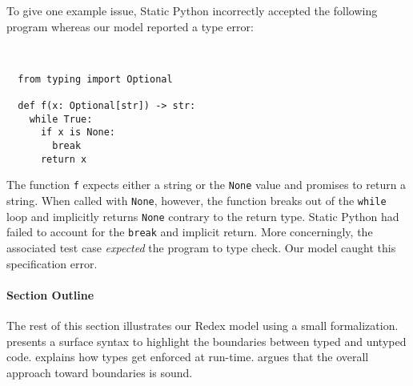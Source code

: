 \documentclass[english,cleveref,submission]{programming}
\newcommand{\SP}{Static Python}
\newcommand{\code}[1]{\texttt{#1}}
\begin{document}

To give one example issue, \SP{} incorrectly accepted the following program whereas our model
reported a type error:

\medskip
\begin{minipage}[t]{0.25\columnwidth}~
\end{minipage}\begin{minipage}[t]{0.4\columnwidth}
\begin{lstlisting}
  from typing import Optional

  def f(x: Optional[str]) -> str:
    while True:
      if x is None:
        break
      return x
\end{lstlisting}
%
\end{minipage}

\noindent{}The function \code{f} expects either a string or the \code{None} value and promises to return a string.
When called with \code{None}, however, the function breaks out of the \code{while} loop
and implicitly returns \code{None} contrary to the return type.
\SP{} had failed to account for the \code{break} and implicit return.
More concerningly, the associated test case \emph{expected} the program to type check.
Our model caught this specification error.


\paragraph{Section Outline}


The rest of this section illustrates our Redex model using a small
formalization.
 presents a surface syntax to highlight the boundaries between
typed and untyped code.
 explains how types get enforced at run-time.
 argues that the overall approach toward boundaries is sound.
\end{document}
